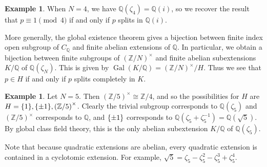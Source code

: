 \documentclass[leqno, openany]{memoir}
\theoremstyle{definition}
\newtheorem{exm}[thm]{Example}
\theoremstyle{remark}
\theoremstyle{plain}
\theoremstyle{definition}
\theoremstyle{remark}
\newcommand{\Z}{\mathbb{Z}}
\newcommand{\Q}{\mathbb{Q}}
\DeclareMathOperator{\Gal}{Gal}
\begin{document}
\begin{exm}
    When $N=4$, we have $\Q(\zeta_4) = \Q(i)$, so we recover the result that $p \equiv 1 \pmod 4$ if and only if $p$ splits in $\Q(i)$.
\end{exm}

More generally, the global existence theorem gives a bijection between finite index open subgroup of $C_{\Q}$ and finite abelian extensions of $\Q$. In particular, we obtain a bijection between finite subgroups of ${(\Z/N)}^{\times}$ and finite abelian subextensions $K/\Q$ of $\Q(\zeta_N)$. This is given by $\Gal(K/\Q) = {(\Z/N)}^{\times} / H$. Thus we see that $p \in H$ if and only if $p$ splits completely in $K$.

\begin{exm}
    Let $N = 5$. Then ${( \Z/5 )}^{\times} \cong \Z/4$, and so the possibilities for $H$ are $H = \qty{1}, \qty{\pm 1}, {(\Z/5)}^{\times}$. Clearly the trivial subgroup corresponds to $\Q(\zeta_5)$ and ${(\Z/5)}^{\times}$ corresponds to $\Q$, and $\qty{\pm 1}$ corresponds to $\Q(\zeta_5 + \zeta_5^{-1}) = \Q(\sqrt{5})$. By global class field theory, this is the only abelian subextension $K/\Q$ of $\Q(\zeta_5)$.
\end{exm}

Note that because quadratic extensions are abelian, every quadratic extension is contained in a cyclotomic extension. For example, $\sqrt{5} = \zeta_5 - \zeta_5^2 - \zeta_5^3 + \zeta_5^4$.
\end{document}
